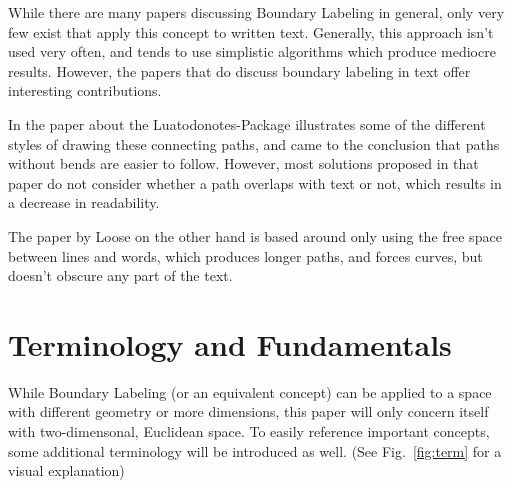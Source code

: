 \documentclass[11pt,a4paper]{vutinfth}
\begin{document}
While there are many papers discussing Boundary Labeling in general, only very few exist that apply this concept to written text. Generally, this approach isn't used very often, and tends to use simplistic algorithms which produce mediocre results. %
However, the papers that do discuss boundary labeling in text offer interesting contributions.

In the paper about the Luatodonotes-Package\cite{Kindermann2014} illustrates some of the different styles of drawing these connecting paths, and came to the conclusion that paths without bends are easier to follow. %
However, most solutions proposed in that paper do not consider whether a path overlaps with text or not, which results in a decrease in readability.

The paper by Loose\cite{Loose2015} on the other hand is based around only using the free space between lines and words, which produces longer paths, and forces curves, but doesn't obscure any part of the text.



\section{Terminology and Fundamentals} %
While Boundary Labeling (or an equivalent concept) can be applied to a space with different geometry or more dimensions, this paper will only concern itself with two-dimensonal, Euclidean space.
To easily reference important concepts, some additional terminology will be introduced as well. (See Fig.~\ref{fig:term} for a visual explanation)%

\end{document}
